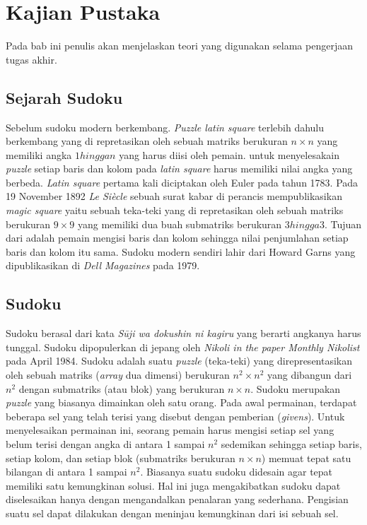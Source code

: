 \chapter{Kajian Pustaka}

Pada bab ini penulis akan menjelaskan teori yang digunakan selama pengerjaan tugas akhir.

\section{Sejarah Sudoku}

Sebelum sudoku modern berkembang. \textit{Puzzle latin square} terlebih dahulu berkembang yang di repretasikan oleh sebuah matriks berukuran ${n \times n}$ yang memiliki angka ${1 hingga n}$ yang harus diisi oleh pemain. untuk menyelesakain \textit{puzzle }setiap baris dan kolom pada \textit{latin square} harus memiliki nilai angka yang berbeda. \textit{Latin square} pertama kali diciptakan oleh Euler pada tahun 1783\cite{Unk1}. Pada 19 November 1892 \textit{ Le Siècle} sebuah surat kabar di perancis mempublikasikan \textit{magic square} yaitu sebuah teka-teki  yang di repretasikan oleh sebuah matriks berukuran ${9 \times 9}$ yang memiliki dua buah submatriks berukuran ${3 hingga 3}$. Tujuan dari  adalah pemain mengisi baris dan kolom sehingga nilai penjumlahan setiap baris dan kolom itu sama. Sudoku modern sendiri lahir dari  Howard Garns yang dipublikasikan di \textit{Dell Magazines} pada 1979\cite{SATPy5}.	



\section{Sudoku}

Sudoku berasal dari kata \textit{Sūji wa dokushin ni kagiru} yang berarti angkanya harus tunggal\cite{SATPy3}. Sudoku dipopulerkan di jepang oleh \textit{Nikoli in the paper Monthly Nikolist} pada April 1984. Sudoku adalah suatu \textit{puzzle} (teka-teki) yang direpresentasikan oleh sebuah matriks (\textit{array}
dua dimensi) berukuran ${n^2 \times n^2}$  yang dibangun dari ${n^2}$ dengan submatriks (atau blok)
yang berukuran ${n \times n}$. Sudoku merupakan \textit{puzzle}
yang biasanya dimainkan oleh satu orang.  Pada
awal permainan, terdapat beberapa sel yang telah terisi yang disebut dengan pemberian
(\textit{givens}). Untuk menyelesaikan permainan ini, seorang pemain harus mengisi setiap sel yang
belum terisi dengan angka di antara 1 sampai
$n^2$ sedemikan sehingga setiap baris, setiap kolom,
dan setiap blok (submatriks berukuran $n \times n$) memuat tepat satu bilangan di antara 1 sampai $n^2$. Biasanya suatu sudoku didesain agar tepat memiliki satu kemungkinan solusi. Hal
ini juga mengakibatkan sudoku dapat diselesaikan hanya dengan mengandalkan penalaran
yang sederhana. Pengisian suatu sel dapat dilakukan dengan meninjau kemungkinan dari
isi sebuah sel.

